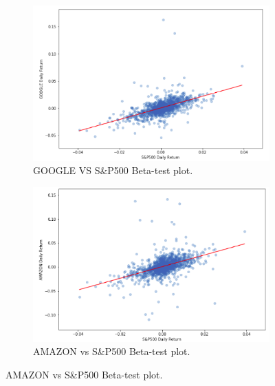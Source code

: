 \begin{figure}[H]
     \centering
     \begin{subfigure}[b]{0.6\textwidth}
         \centering
         \includegraphics[width=\textwidth]{imgs/beta_1_plot.png}
         \caption{GOOGLE VS S\&P500 Beta-test plot.}
         \label{fig:beta_1_plot}
     \end{subfigure}
     \hfill
     \begin{subfigure}[b]{0.6\textwidth}
         \centering
         \includegraphics[width=\textwidth]{imgs/beta_2_plot.png}
         \caption{AMAZON vs S\&P500 Beta-test plot.}
         \label{fig:beta_2_plot}
     \end{subfigure}
\end{figure}

